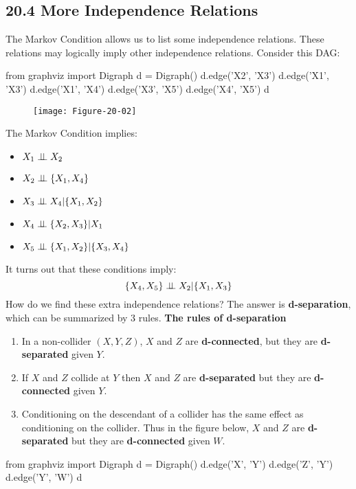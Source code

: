 \subsection*{20.4 More Independence Relations}\label{more-independence-relations}
The Markov Condition allows us to list some independence relations.
These relations may logically imply other independence relations.
Consider this DAG:

\begin{python}
from graphviz import Digraph
d = Digraph()
d.edge('X2', 'X3')
d.edge('X1', 'X3')
d.edge('X1', 'X4')
d.edge('X3', 'X5')
d.edge('X4', 'X5')
d
\end{python}

\begin{figure}[H]
\centering
\texttt{[image: Figure-20-02]}
\end{figure}

The Markov Condition implies:
\begin{itemize}[tightlist]
\item
  \(X_{1} \perp\!\!\!\perp X_{2}\)
\item
  \(X_{2} \perp\!\!\!\perp \{ X_{1}, X_{4} \}\)
\item
  \(X_{3} \perp\!\!\!\perp X_{4} | \{ X_{1}, X_{2} \}\)
\item
  \(X_{4} \perp\!\!\!\perp \{ X_{2}, X_{3} \} | X_{1}\)
\item
  \(X_{5} \perp\!\!\!\perp \{ X_{1}, X_{2} \} | \{X_{3}, X_{4}\}\)
\end{itemize}
It turns out that these conditions imply:
\[
\{ X_{4}, X_{5} \} \perp\!\!\!\perp X_{2} | \{ X_{1}, X_{3} \}
\]
How do we find these extra independence relations? The answer is
\textbf{d-separation}, which can be summarized by 3 rules.
\textbf{The rules of d-separation}
\begin{enumerate}[tightlist,label={\arabic*.}]
\item
  In a non-collider \((X, Y, Z)\), \(X\) and \(Z\) are
  \textbf{d-connected}, but they are \textbf{d-separated} given \(Y\).
\item
  If \(X\) and \(Z\) collide at \(Y\) then \(X\) and \(Z\) are
  \textbf{d-separated} but they are \textbf{d-connected} given \(Y\).
\item
  Conditioning on the descendant of a collider has the same effect as
  conditioning on the collider. Thus in the figure below, \(X\) and
  \(Z\) are \textbf{d-separated} but they are \textbf{d-connected} given
  \(W\).
\end{enumerate}

\begin{python}
from graphviz import Digraph
d = Digraph()
d.edge('X', 'Y')
d.edge('Z', 'Y')
d.edge('Y', 'W')
d
\end{python}

